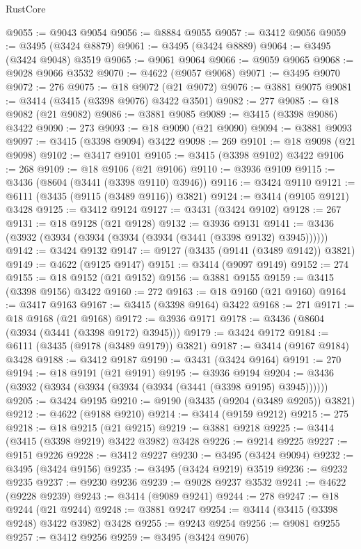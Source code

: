 \begin{lexlean}{RustCore}
\begin{coremodule}
@9055 := @9043 @9054
@9056 := @8884 @9055
@9057 := @3412 @9056
@9059 := @3495 (@3424 @8879)
@9061 := @3495 (@3424 @8889)
@9064 := @3495 (@3424 @9048) @3519
@9065 := @9061 @9064
@9066 := @9059 @9065
@9068 := @9028 @9066 @3532
@9070 := @4622 (@9057 @9068)
@9071 := @3495 @9070
@9072 := 276
@9075 := @18 @9072 (@21 @9072)
@9076 := @3881 @9075
@9081 := @3414 (@3415 (@3398 @9076) @3422 @3501)
@9082 := 277
@9085 := @18 @9082 (@21 @9082)
@9086 := @3881 @9085
@9089 := @3415 (@3398 @9086) @3422
@9090 := 273
@9093 := @18 @9090 (@21 @9090)
@9094 := @3881 @9093
@9097 := @3415 (@3398 @9094) @3422
@9098 := 269
@9101 := @18 @9098 (@21 @9098)
@9102 := @3417 @9101
@9105 := @3415 (@3398 @9102) @3422
@9106 := 268
@9109 := @18 @9106 (@21 @9106)
@9110 := @3936 @9109
@9115 := @3436 (@8604 (@3441 (@3398 @9110) @3946))
@9116 := @3424 @9110
@9121 := @6111 (@3435 (@9115 (@3489 @9116)) @3821)
@9124 := @3414 (@9105 @9121) @3428
@9125 := @3412 @9124
@9127 := @3431 (@3424 @9102)
@9128 := 267
@9131 := @18 @9128 (@21 @9128)
@9132 := @3936 @9131
@9141 := @3436 (@3932 (@3934 (@3934 (@3934 (@3934 (@3441 (@3398 @9132) @3945))))))
@9142 := @3424 @9132
@9147 := @9127 (@3435 (@9141 (@3489 @9142)) @3821)
@9149 := @4622 (@9125 @9147)
@9151 := @3414 (@9097 @9149)
@9152 := 274
@9155 := @18 @9152 (@21 @9152)
@9156 := @3881 @9155
@9159 := @3415 (@3398 @9156) @3422
@9160 := 272
@9163 := @18 @9160 (@21 @9160)
@9164 := @3417 @9163
@9167 := @3415 (@3398 @9164) @3422
@9168 := 271
@9171 := @18 @9168 (@21 @9168)
@9172 := @3936 @9171
@9178 := @3436 (@8604 (@3934 (@3441 (@3398 @9172) @3945)))
@9179 := @3424 @9172
@9184 := @6111 (@3435 (@9178 (@3489 @9179)) @3821)
@9187 := @3414 (@9167 @9184) @3428
@9188 := @3412 @9187
@9190 := @3431 (@3424 @9164)
@9191 := 270
@9194 := @18 @9191 (@21 @9191)
@9195 := @3936 @9194
@9204 := @3436 (@3932 (@3934 (@3934 (@3934 (@3934 (@3441 (@3398 @9195) @3945))))))
@9205 := @3424 @9195
@9210 := @9190 (@3435 (@9204 (@3489 @9205)) @3821)
@9212 := @4622 (@9188 @9210)
@9214 := @3414 (@9159 @9212)
@9215 := 275
@9218 := @18 @9215 (@21 @9215)
@9219 := @3881 @9218
@9225 := @3414 (@3415 (@3398 @9219) @3422 @3982) @3428
@9226 := @9214 @9225
@9227 := @9151 @9226
@9228 := @3412 @9227
@9230 := @3495 (@3424 @9094)
@9232 := @3495 (@3424 @9156)
@9235 := @3495 (@3424 @9219) @3519
@9236 := @9232 @9235
@9237 := @9230 @9236
@9239 := @9028 @9237 @3532
@9241 := @4622 (@9228 @9239)
@9243 := @3414 (@9089 @9241)
@9244 := 278
@9247 := @18 @9244 (@21 @9244)
@9248 := @3881 @9247
@9254 := @3414 (@3415 (@3398 @9248) @3422 @3982) @3428
@9255 := @9243 @9254
@9256 := @9081 @9255
@9257 := @3412 @9256
@9259 := @3495 (@3424 @9076)

\end{coremodule}
\end{lexlean}
